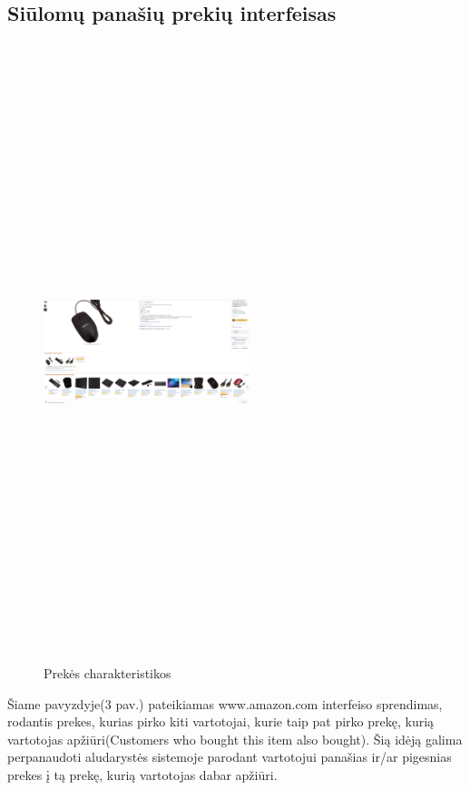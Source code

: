 \documentclass[oneside]{VUMIFPSkursinis}
\begin{document}
	\subsection{Siūlomų panašių prekių interfeisas }
		\begin{figure}[h]
			\centering
			\includegraphics[width=6cm,height=18cm,keepaspectratio]{IkvepiantisInterfeisas3.png}
			\caption{ Prekės charakteristikos}
		\end{figure}

			Šiame pavyzdyje(3 pav.) pateikiamas www.amazon.com interfeiso sprendimas, rodantis prekes, kurias pirko kiti vartotojai, kurie taip pat pirko prekę, kurią vartotojas apžiūri(Customers who bought this item also bought). 
			Šią idėją galima perpanaudoti aludarystės sistemoje parodant vartotojui panašias ir/ar pigesnias prekes į tą prekę, kurią vartotojas dabar apžiūri.

	\pagebreak
\end{document}
